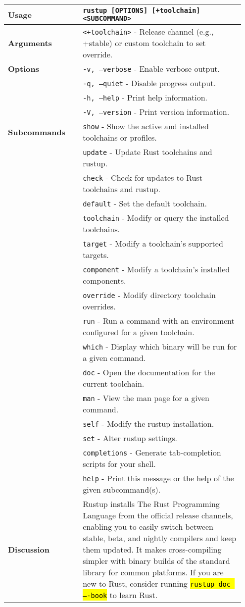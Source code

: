 \begin{longtable}{|p{0.3\linewidth}|p{0.65\linewidth}|}
	\textbf{Usage} & \texttt{rustup [OPTIONS] [+toolchain] <SUBCOMMAND>} \\
	\hline
	\textbf{Arguments} & \texttt{<+toolchain>} - Release channel (e.g., +stable) or custom toolchain to set override. \\
	\hline
	\textbf{Options} & 
	\texttt{-v, --verbose} - Enable verbose output. \\
	& \texttt{-q, --quiet} - Disable progress output. \\
	& \texttt{-h, --help} - Print help information. \\
	& \texttt{-V, --version} - Print version information. \\
	\hline
	\textbf{Subcommands} & 
	\texttt{show} - Show the active and installed toolchains or profiles. \\
	& \texttt{update} - Update Rust toolchains and rustup. \\
	& \texttt{check} - Check for updates to Rust toolchains and rustup. \\
	& \texttt{default} - Set the default toolchain. \\
	& \texttt{toolchain} - Modify or query the installed toolchains. \\
	& \texttt{target} - Modify a toolchain's supported targets. \\
	& \texttt{component} - Modify a toolchain's installed components. \\
	& \texttt{override} - Modify directory toolchain overrides. \\
	& \texttt{run} - Run a command with an environment configured for a given toolchain. \\
	& \texttt{which} - Display which binary will be run for a given command. \\
	& \texttt{doc} - Open the documentation for the current toolchain. \\
	& \texttt{man} - View the man page for a given command. \\
	& \texttt{self} - Modify the rustup installation. \\
	& \texttt{set} - Alter rustup settings. \\
	& \texttt{completions} - Generate tab-completion scripts for your shell. \\
	& \texttt{help} - Print this message or the help of the given subcommand(s). \\
	\hline
	\textbf{Discussion} & Rustup installs The Rust Programming Language from the official release channels, enabling you to easily switch between stable, beta, and nightly compilers and keep them updated. It makes cross-compiling simpler with binary builds of the standard library for common platforms. If you are new to Rust, consider running \hl{\texttt{rustup doc ----book}} to learn Rust. \\
\end{longtable}
